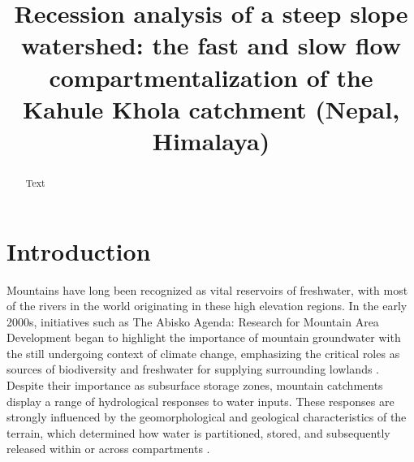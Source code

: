 \documentclass[hess, manuscript]{copernicus}
\begin{document}
\title{Recession analysis of a steep slope watershed: the fast and slow flow compartmentalization of the Kahule Khola catchment (Nepal, Himalaya)}









\received{}
\pubdiscuss{} %
\revised{}
\accepted{}
\published{}


\maketitle

\begin{abstract}
Text
\end{abstract}

\section{Introduction}

Mountains have long been recognized as vital reservoirs of freshwater, with most of the rivers in the world originating in these high elevation regions. In the early 2000s, initiatives such as The Abisko Agenda: Research for Mountain Area Development began to highlight the importance of mountain groundwater with the still undergoing context of climate change, emphasizing the critical roles as sources of biodiversity and freshwater for supplying surrounding lowlands \citep{abisko-2002,viviroli-2004}. Despite their importance as subsurface storage zones, mountain catchments display a range of hydrological responses to water inputs. These responses are strongly influenced by the geomorphological and geological characteristics of the terrain, which determined how water is partitioned, stored, and subsequently released within or across compartments \citep{beven-1982}.
\end{document}

